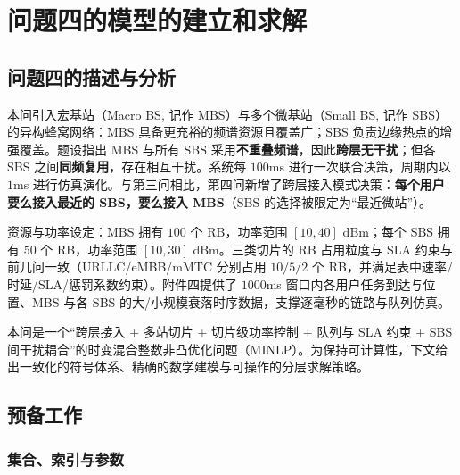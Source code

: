 \section{问题四的模型的建立和求解}
\subsection{问题四的描述与分析}

本问引入宏基站（Macro BS, 记作 MBS）与多个微基站（Small BS, 记作 SBS）的异构蜂窝网络：MBS 具备更充裕的频谱资源且覆盖广；SBS 负责边缘热点的增强覆盖。题设指出 MBS 与所有 SBS 采用\textbf{不重叠频谱}，因此\textbf{跨层无干扰}；但各 SBS 之间\textbf{同频复用}，存在相互干扰。系统每 $100$ms 进行一次联合决策，周期内以 $1$ms 进行仿真演化。与第三问相比，第四问新增了跨层接入模式决策：\textbf{每个用户要么接入最近的 SBS，要么接入 MBS}（SBS 的选择被限定为“最近微站”）。

资源与功率设定：MBS 拥有 $100$ 个 RB，功率范围 $[10,40]$ dBm；每个 SBS 拥有 $50$ 个 RB，功率范围 $[10,30]$ dBm。三类切片的 RB 占用粒度与 SLA 约束与前几问一致（URLLC/eMBB/mMTC 分别占用 $10/5/2$ 个 RB，并满足表中速率/时延/SLA/惩罚系数约束）。附件四提供了 $1000$ms 窗口内各用户任务到达与位置、MBS 与各 SBS 的大/小规模衰落时序数据，支撑逐毫秒的链路与队列仿真。

本问是一个“跨层接入 + 多站切片 + 切片级功率控制 + 队列与 SLA 约束 + SBS 间干扰耦合”的时变混合整数非凸优化问题（MINLP）。为保持可计算性，下文给出一致化的符号体系、精确的数学建模与可操作的分层求解策略。

\subsection{预备工作}

\subsubsection{集合、索引与参数}

